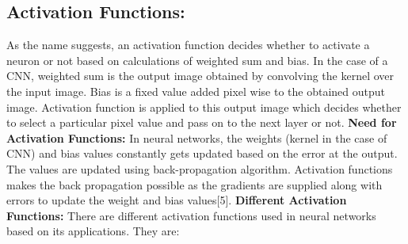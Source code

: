 \documentclass{IEEEtran}
\begin{document}
\subsection{\textbf{Activation Functions:}}
As the name suggests, an activation function decides whether to activate a neuron or not based on calculations of weighted sum and bias. In the case of a CNN, weighted sum is the output image obtained by convolving the kernel over the input image. Bias is a fixed value added pixel wise to the obtained output image. Activation function is applied to this output image which decides whether to select a particular pixel value and pass on to the next layer or not. 
\newline
\textbf{Need for Activation Functions:} In neural networks, the weights (kernel in the case of CNN) and bias values constantly gets updated based on the error at the output. The values are updated using back-propagation algorithm. Activation functions makes the back propagation possible as the gradients are supplied along with errors to update the weight and bias values[5].
\newline
\textbf{Different Activation Functions:} There are different activation functions used in neural networks based on its applications. They are:
\end{document}
